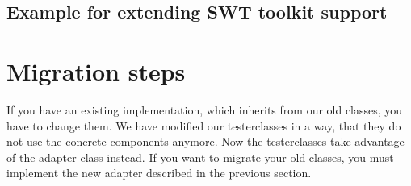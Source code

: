 \subsection{Example for extending SWT toolkit support}

\section{Migration steps}
If you have an existing implementation, which inherits from our old classes,
you have to change them. We have modified our testerclasses in a way, that they
do not use the concrete components anymore. Now the testerclasses take
advantage of the adapter class instead. If you want to migrate your old
classes, you must implement the new adapter described in the previous section.
